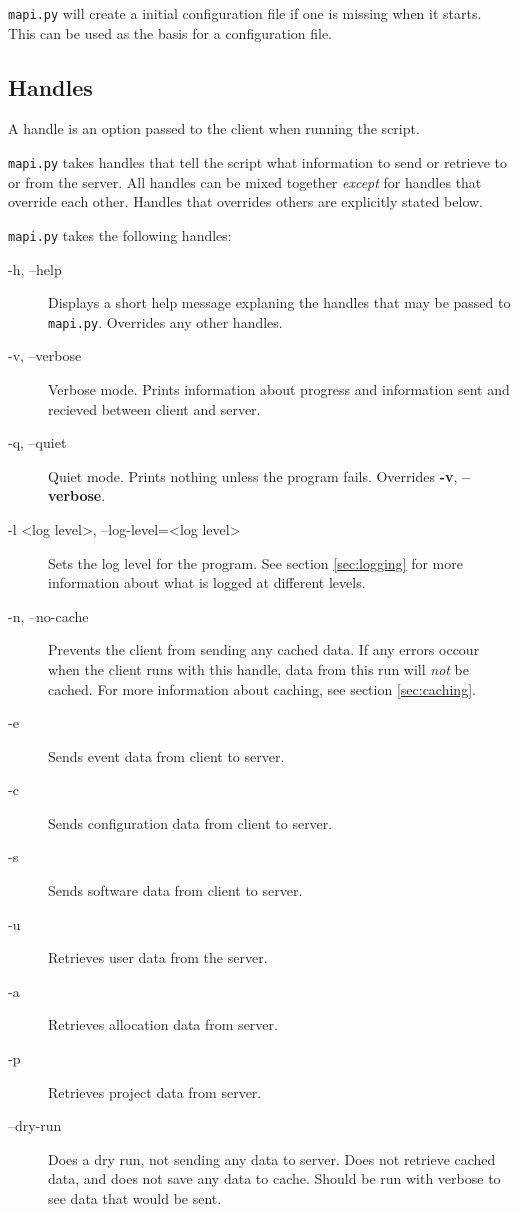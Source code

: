 \texttt{mapi.py} will create a initial configuration file if one is missing
when it starts. This can be used as the basis for a configuration file. 


\subsection{Handles}
\label{sec:handles}
A handle is an option passed to the client when running the script.

\texttt{mapi.py} takes handles that tell the script what information to send
or retrieve to or from the server. All handles can be mixed together
\textit{except} for handles that override each other. Handles that overrides
others are explicitly stated below.

\texttt{mapi.py} takes the following handles:

\begin{description}
    \item[-h, --help]   Displays a short help message explaning the handles
    that may be passed to \texttt{mapi.py}. Overrides any other handles.
    \item[-v, --verbose]    Verbose mode. Prints information about progress and
    information sent and recieved between client and server. 
    \item[-q, --quiet]  Quiet mode. Prints nothing unless the program fails.
    Overrides \textbf{-v}, \textbf{--verbose}.
    \item[-l \textless log level\textgreater, --log-level=\textless log
    level\textgreater] Sets the log level for the program. See section 
    \ref{sec:logging} for more information about what is logged at different 
    levels.
    \item[-n, --no-cache]   Prevents the client from sending any cached data.
    If any errors occour when the client runs with this handle, data from this
    run will \textit{not} be cached. For more information about caching, see
    section \ref{sec:caching}.
    \item[-e]   Sends event data from client to server.
    \item[-c]   Sends configuration data from client to server.
    \item[-s]   Sends software data from client to server.
    \item[-u]   Retrieves user data from the server.
    \item[-a]   Retrieves allocation data from server.
    \item[-p]   Retrieves project data from server.
    \item[--dry-run]    Does a dry run, not sending any data to server. Does
        not retrieve cached data, and does not save any data to cache.
        Should be run with verbose to see data that would be sent.
\end{description}

